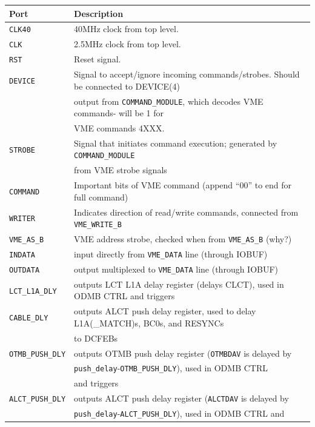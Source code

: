 \documentclass[10pt,a4paper]{article}
\begin{document}
\begin{table}[H]
\begin{tabular}{|l|l|} \hline
Port& Description\\ \hline
\texttt{CLK40}& 40MHz clock from top level.\\ \hline
\texttt{CLK}& 2.5MHz clock from top level.\\ \hline
\texttt{RST}& Reset signal.\\ \hline
\texttt{DEVICE}& Signal to accept/ignore incoming commands/strobes. Should be connected to DEVICE(4) \\
      & output from \texttt{COMMAND\_MODULE}, which decodes VME commands- will be 1 for \\
			& VME commands 4XXX.\\ \hline 
\texttt{STROBE}& Signal that initiates command execution; generated by \texttt{COMMAND\_MODULE} \\
      & from VME strobe signals\\ \hline
\texttt{COMMAND}& Important bits of VME command (append ``00'' to end for full command)\\ \hline
\texttt{WRITER}& Indicates direction of read/write commands, connected from \texttt{VME\_WRITE\_B}\\ \hline
\texttt{VME\_AS\_B}& VME address strobe, checked when from \texttt{VME\_AS\_B} (why?)\\ \hline
\texttt{INDATA}& input directly from \texttt{VME\_DATA} line (through IOBUF)\\ \hline
\texttt{OUTDATA}& output multiplexed to \texttt{VME\_DATA} line (through IOBUF)\\ \hline
\texttt{LCT\_L1A\_DLY}& outputs LCT L1A delay register (delays CLCT), used in ODMB CTRL and triggers\\ \hline
\texttt{CABLE\_DLY}& outputs ALCT push delay register, used to delay L1A(\_MATCH)s, BC0s, and RESYNCs \\
                   & to DCFEBs\\ \hline
\texttt{OTMB\_PUSH\_DLY}& outputs OTMB push delay register (\texttt{OTMBDAV} is delayed by\\
                        & \texttt{push\_delay}-\texttt{OTMB\_PUSH\_DLY}), used in ODMB CTRL \\
												& and triggers\\ \hline
\texttt{ALCT\_PUSH\_DLY}& outputs ALCT push delay register (\texttt{ALCTDAV} is delayed by  \\
                        & \texttt{push\_delay}-\texttt{ALCT\_PUSH\_DLY}), used in ODMB CTRL and \\

\end{tabular}
\end{table}
\end{document}
